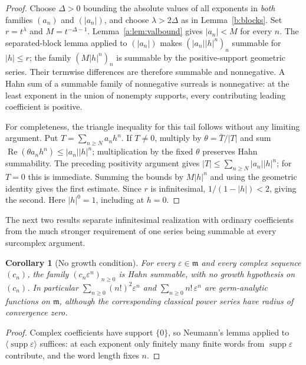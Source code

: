 \documentclass[11pt,a4paper]{article}
\numberwithin{equation}{section}
\newtheorem{corollary}[theorem]{Corollary}
\theoremstyle{definition}
\theoremstyle{remark}
\theoremstyle{plain}
\newcommand{\mm}{\mathfrak m}
\DeclareMathOperator{\supp}{supp}
\newcommand{\tm}{t}
\newcommand{\Neu}[1]{\langle #1\rangle}
\newcommand{\abs}[1]{\lvert #1\rvert}
\begin{document}
\begin{proof}
Choose $\Delta>0$ bounding the absolute values of all exponents in
\emph{both} families $(a_n)$ and $(\abs{a_n})$, and choose
$\lambda>2\Delta$ as in Lemma~\ref{b:blocks}. Set
$r=\tm^\lambda$ and $M=\tm^{-\Delta-1}$.
Lemma~\ref{a:lem:valbound} gives $\abs{a_n}<M$ for every $n$.
The separated-block lemma applied to $(\abs{a_n})$ makes
$(\abs{a_n}\abs h^n)_n$ summable for $\abs h\le r$; the family
$(M\abs h^n)_n$ is summable by the positive-support geometric series.
Their termwise differences are therefore summable and nonnegative.
A Hahn sum of a summable family of nonnegative surreals is nonnegative:
at the least exponent in the union of nonempty supports, every
contributing leading coefficient is positive.

For completeness, the triangle inequality for this tail follows without
any limiting argument. Put $T=\sum_{n\ge N}a_nh^n$. If $T\ne0$, multiply
by $\theta=\bar T/\abs T$ and sum
$\operatorname{Re}(\theta a_nh^n)\le\abs{a_n}\abs h^n$; multiplication
by the fixed $\theta$ preserves Hahn summability. The preceding positivity
argument gives $\abs T\le\sum_{n\ge N}\abs{a_n}\abs h^n$; for $T=0$
this is immediate. Summing the bounds by $M\abs h^n$ and using the
geometric identity gives the first estimate. Since $r$ is infinitesimal,
$1/(1-\abs h)<2$, giving the second. Here $\abs h^0=1$, including at
$h=0$.
\end{proof}

The next two results separate infinitesimal realization with ordinary
coefficients from the much stronger requirement of one series being
summable at every surcomplex argument.

\begin{corollary}[No growth condition]
\label{b:nogrowth}
For every $\varepsilon\in\mm$ and every complex sequence $(c_n)$, the
family $(c_n\varepsilon^{n})_{n\ge0}$ is Hahn summable, with no growth
hypothesis on $(c_n)$. In particular $\sum_{n\ge0}(n!)^{2}\varepsilon^{n}$
and $\sum_{n\ge0}n!\,\varepsilon^{n}$ are germ-analytic functions on
$\mm$, although the corresponding classical power series have radius of
convergence zero.
\end{corollary}

\begin{proof}
Complex coefficients have support $\{0\}$, so Neumann's lemma applied to
$\Neu{\supp\varepsilon}$ suffices: at each exponent only finitely many
finite words from $\supp\varepsilon$ contribute, and the word length fixes
$n$.
\end{proof}
\end{document}
